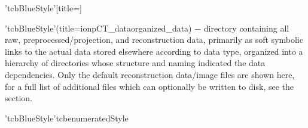 \begin{tcbenvironment}'tcbBlueStyle'[title=]%
\begin{tcbparagraph}'tcbBlueStyle'(title=\dirsep ion\dirsep pCT\_data\dirsep organized\_data)%
$\boldsymbol{-}$ directory containing all raw, preprocessed/projection, and reconstruction data, primarily as soft symbolic links to the actual data stored elsewhere according to data type, organized into a hierarchy of directories whose structure and naming indicated the data dependencies.  Only the default reconstruction data/image files are shown here, for a full list of additional files which can optionally be written to disk, see the  section.
\end{tcbparagraph}
\begin{tcbparagraph}'tcbBlueStyle'{tcbenumeratedStyle}
    \begin{ThinEnum}
        \item {}
        \begin{ThinEnum}
            \item {}
            \item {}
            \begin{ThinEnum}
                \item {}
                \begin{ThinEnum}
                    \item {}

\end{ThinEnum}
\end{ThinEnum}
\end{ThinEnum}
\end{ThinEnum}
\end{tcbparagraph}
\end{tcbenvironment}
